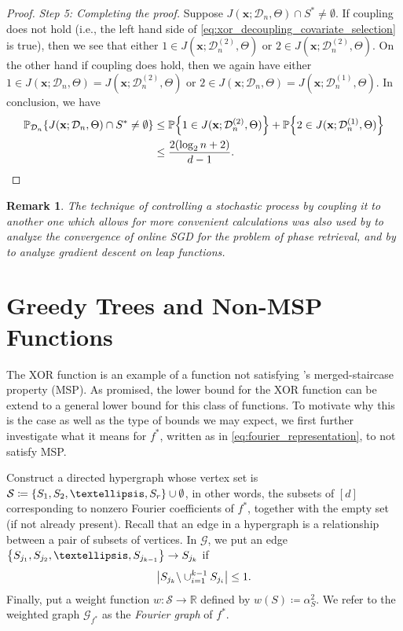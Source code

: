 \documentclass[11pt]{article}
\newtheorem{remark}[theorem]{Remark}
\newcommand{\bx}{\mathbf{x}}
\DeclarePairedDelimiter{\braces}{\lbrace}{\rbrace}
\DeclarePairedDelimiter{\abs}{|}{|}
\newcommand{\R}{\mathbb{R}}
\renewcommand{\P}{\mathbb{P}}
\newcommand{\nfeats}{d}
\newcommand{\nsamples}{n}
\newcommand{\coordindices}{[\nfeats]}
\newcommand{\data}[1][n]{\mathcal{D}_{#1}}
\newcommand{\MSP}{\textsf{MSP}}
\newcommand{\suppset}{S^*}
\newcommand{\fcoefs}{\mathcal{S}}
\newcommand{\graph}{\mathcal{G}}
\begin{document}
\begin{proof}
    \textit{Step 5: Completing the proof.}
    Suppose $J(\bx;\data,\Theta)\cap \suppset \neq \emptyset$.
    If coupling does not hold (i.e., the left hand side of \eqref{eq:xor_decoupling_covariate_selection} is true), then we see that either $1 \in J(\bx;\data^{(2)},\Theta)$ or $2 \in J(\bx;\data^{(2)},\Theta)$.
    On the other hand if coupling does hold, then we again have either $1 \in J(\bx;\data,\Theta) = J(\bx;\data^{(2)},\Theta)$ or $2 \in J(\bx;\data,\Theta) = J(\bx;\data^{(1)},\Theta)$.
    In conclusion, we have
    \begin{equation}
    \begin{split}
        \P_{\data}\braces*{J(\bx;\data,\Theta)\cap \suppset \neq \emptyset } & \leq \P\braces*{1 \in J(\bx;\data^{(2)},\Theta)} + \P\braces*{2 \in J(\bx;\data^{(1)},\Theta)} \\
        & \leq \frac{2(\log_2 \nsamples + 2)}{\nfeats - 1}.\qedhere
        \end{split}
    \end{equation}
\end{proof}

\begin{remark}
    The technique of controlling a stochastic process by coupling it to another one which allows for more convenient calculations was also used by \cite{tan2019online} to analyze the convergence of online SGD for the problem of phase retrieval, and by \cite{abbe2023polynomial, abbe2022on} to analyze gradient descent on leap functions.
\end{remark}


\section{Greedy Trees and Non-MSP Functions}
\label{sec:greedy_and_non_msp}

The XOR function is an example of a function not satisfying \cite{abbe2022merged}'s merged-staircase property (\MSP).
As promised, the lower bound for the XOR function can be extend to a general lower bound for this class of functions.
To motivate why this is the case as well as the type of bounds we may expect, we first further investigate what it means for $f^*$, written as in \eqref{eq:fourier_representation}, to not satisfy \MSP.

Construct a directed hypergraph whose vertex set is $\fcoefs \coloneqq \braces*{S_1,S_2,\ldots,S_r}\cup{\emptyset}$, in other words, the subsets of $\coordindices$ corresponding to nonzero Fourier coefficients of $f^*$, together with the empty set (if not already present).
Recall that an edge in a hypergraph is a relationship between a pair of subsets of vertices.
In $\graph$, we put an edge $\braces*{S_{j_1},S_{j_2},\ldots,S_{j_{k-1}}} \to S_{j_{k}}$ if
\begin{equation}
    \abs*{S_{j_k}\backslash \cup_{i=1}^{k-1}S_{j_i}} \leq 1.
\end{equation}
Finally, put a weight function $w\colon \fcoefs \to \R$ defined by $w(S) \coloneqq \alpha_S^2$.
We refer to the weighted graph $\mathcal{G}_{f^*}$ as the \emph{Fourier graph} of $f^*$. 
\end{document}
